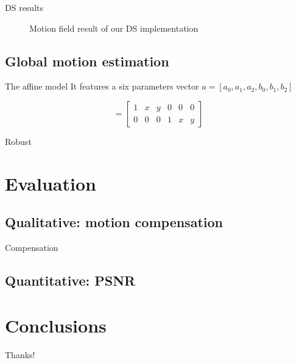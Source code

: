 \documentclass[aspectratio=1610,xcolor=dvipsnames]{beamer}
\begin{document}
\begin{frame}{DS results}
\begin{figure}[H]
\begin{minipage}[b]{0.45\textwidth}
            \label{fig:bbme-3-res}
		\end{minipage}
        \label{fig:bbme-3}
        \caption{Motion field result of our DS implementation}
	\end{figure}
\end{frame}

\subsection{Global motion estimation}
\begin{frame}{The affine model}
    It features a six parameters vector \(a = [a_0, a_1, a_2, b_0, b_1, b_2]\)

    \begin{equation*}
        [A(x)] = 
        \begin{bmatrix}
            1 & x & y & 0 & 0 & 0 \\
            0 & 0 & 0 & 1 & x & y
        \end{bmatrix}
    \end{equation*}
\end{frame}

\begin{frame}{Robust}
    
\end{frame}


\section{Evaluation}
\subsection{Qualitative: motion compensation}
\begin{frame}{Compensation}

\end{frame}
\subsection{Quantitative: PSNR}

\section{Conclusions}

\begin{frame}
    \begin{center}
        {\Huge\calligra Thanks!}
    \end{center}
\end{frame}
\end{document}
